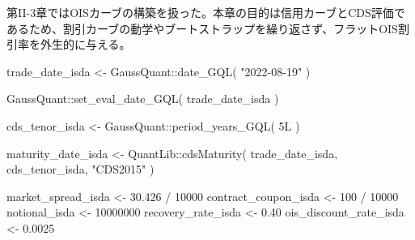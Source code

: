\documentclass[
  letterpaper,
  DIV=11,
  numbers=noendperiod]{scrreprt}
\newenvironment{Shaded}{\begin{snugshade}}{\end{snugshade}}
\newcommand{\DecValTok}[1]{\textcolor[rgb]{0.68,0.00,0.00}{#1}}
\newcommand{\FloatTok}[1]{\textcolor[rgb]{0.68,0.00,0.00}{#1}}
\newcommand{\FunctionTok}[1]{\textcolor[rgb]{0.28,0.35,0.67}{#1}}
\newcommand{\NormalTok}[1]{\textcolor[rgb]{0.00,0.23,0.31}{#1}}
\newcommand{\OtherTok}[1]{\textcolor[rgb]{0.00,0.23,0.31}{#1}}
\newcommand{\SpecialCharTok}[1]{\textcolor[rgb]{0.37,0.37,0.37}{#1}}
\newcommand{\StringTok}[1]{\textcolor[rgb]{0.13,0.47,0.30}{#1}}
\begin{document}
第II-3章ではOISカーブの構築を扱った。本章の目的は信用カーブとCDS評価であるため、割引カーブの動学やブートストラップを繰り返さず、フラットOIS割引率を外生的に与える。

\begin{Shaded}
\begin{Highlighting}[]
\NormalTok{trade\_date\_isda }\OtherTok{\textless{}{-}}\NormalTok{ GaussQuant}\SpecialCharTok{::}\FunctionTok{date\_GQL}\NormalTok{(}
  \StringTok{"2022{-}08{-}19"}
\NormalTok{)}

\NormalTok{GaussQuant}\SpecialCharTok{::}\FunctionTok{set\_eval\_date\_GQL}\NormalTok{(}
\NormalTok{  trade\_date\_isda}
\NormalTok{)}

\NormalTok{cds\_tenor\_isda }\OtherTok{\textless{}{-}}\NormalTok{ GaussQuant}\SpecialCharTok{::}\FunctionTok{period\_years\_GQL}\NormalTok{(}
  \DecValTok{5}\NormalTok{L}
\NormalTok{)}

\NormalTok{maturity\_date\_isda }\OtherTok{\textless{}{-}}\NormalTok{ QuantLib}\SpecialCharTok{::}\FunctionTok{cdsMaturity}\NormalTok{(}
\NormalTok{  trade\_date\_isda,}
\NormalTok{  cds\_tenor\_isda,}
  \StringTok{"CDS2015"}
\NormalTok{)}

\NormalTok{market\_spread\_isda }\OtherTok{\textless{}{-}} \FloatTok{30.426} \SpecialCharTok{/} \DecValTok{10000}
\NormalTok{contract\_coupon\_isda }\OtherTok{\textless{}{-}} \DecValTok{100} \SpecialCharTok{/} \DecValTok{10000}
\NormalTok{notional\_isda }\OtherTok{\textless{}{-}} \DecValTok{10000000}
\NormalTok{recovery\_rate\_isda }\OtherTok{\textless{}{-}} \FloatTok{0.40}
\NormalTok{ois\_discount\_rate\_isda }\OtherTok{\textless{}{-}} \FloatTok{0.0025}


\end{Highlighting}
\end{Shaded}
\end{document}
